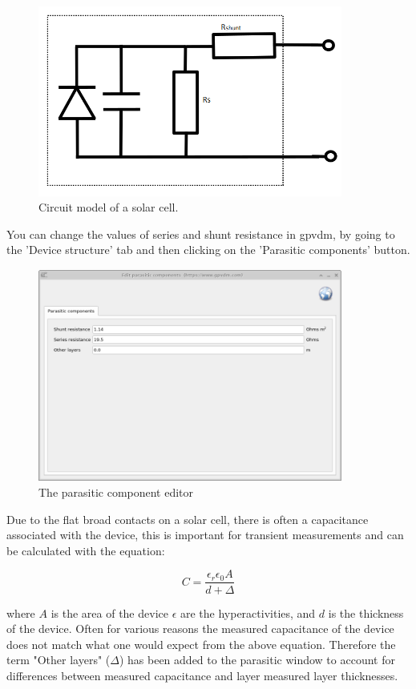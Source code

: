 \begin{figure}[h!]
\centering
\includegraphics[width=100mm]{./images/parasitic_circuit.png}
\caption{Circuit model of a solar cell.}
\label{fig:parasitic_circuit}
\end{figure}


You can change the values of series and shunt resistance in gpvdm, by going to the 'Device structure' tab and then clicking on the 'Parasitic components' button.

\begin{figure}[H]
\centering
\includegraphics[width=100mm,height=70mm]{./images/parasitic.png}
\caption{The parasitic component editor}
\label{fig:parasitic}
\end{figure}

Due to the flat broad contacts on a solar cell, there is often a capacitance associated with the device, this is important for transient measurements and can be calculated with the equation:

\begin{equation}
C=\frac{\epsilon_r \epsilon_0 A}{d+\Delta}
\end{equation}

where $A$ is the area of the device $\epsilon$ are the hyperactivities, and $d$ is the thickness of the device.  Often for various reasons the measured capacitance of the device does not match what one would expect from the above equation. Therefore the term "Other layers" ($\Delta$) has been added to the parasitic window to account for differences between measured capacitance and layer measured layer thicknesses.


